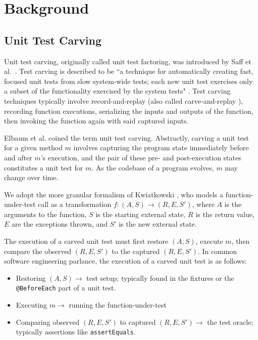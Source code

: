 \chapter{Background}


\section{Unit Test Carving}

Unit test carving, originally called unit test factoring, was introduced by Saff et al.\ \cite{saff2005automatic}. Test carving is
described to be ``a technique for
automatically creating fast, focused unit tests from slow system-wide tests; each new unit test exercises
only a subset of the functionality
exercised by the system tests" \cite*{saff2004mock, saff2005automatic}. Test carving techniques typically
involve record-and-replay (also called
carve-and-replay \cite*{elbaum2006carving, elbaum2008carving}), recording function executions, serializing
the inputs and outputs of the function,
then invoking the function again with said captured inputs.

Elbaum et al. \cite{elbaum2006carving} coined the term unit test carving. Abstractly, carving a unit
test for a given method $m$ involves capturing the program state immediately before and after $m$'s
execution, and the pair of these pre- and post-execution states constitutes a unit test for $m$. As
the codebase of a program evolves, $m$ may change over time.

We adopt the more granular formalism of Kwiatkowski \cite{l2011capture}, who models a function-under-test
call as a transformation $f : (A, S) \rightarrow (R, E, S')$, where $A$ is the arguments to the function,
$S$ is the starting external state, $R$ is the return value, $E$ are the exceptions thrown, and $S'$ is
the new external state.

The execution of a carved unit test must first restore $(A, S)$, execute $m$, then compare the observed
$(R, E, S')$ to the captured $(R, E, S')$. In common software engineering parlance, the execution of a
carved unit test is as follows:

\begin{itemize}
  \item Restoring $(A, S) \rightarrow$ test setup; typically found in the fixtures or the
        \verb|@BeforeEach| part of a unit test.
  \item Executing $m \rightarrow$ running the function-under-test
  \item Comparing observed $(R, E, S')$ to captured $(R, E, S') \rightarrow$ the test oracle; typically
        assertions like \verb|assertEquals|.
\end{itemize}

